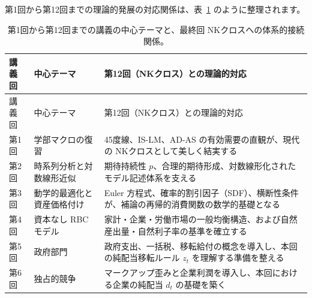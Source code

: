 \documentclass[
  japanese,
  lualatex,
  ja=standard,
  12pt,
  a4paper]{ltjsarticle}
\begin{document}
第1回から第12回までの理論的発展の対応関係は、表~\ref{tbl-course-map}
のように整理されます。

\begin{longtable}[]{@{}
  >{\raggedleft\arraybackslash}p{}
  >{\raggedright\arraybackslash}p{}
  >{\raggedright\arraybackslash}p{}@{}}
\caption{第1回から第12回までの講義の中心テーマと、最終回
NKクロスへの体系的接続関係。}\label{tbl-course-map}\tabularnewline
\toprule\noalign{}
\begin{minipage}[b]{\linewidth}\raggedleft
講義回
\end{minipage} & \begin{minipage}[b]{\linewidth}\raggedright
中心テーマ
\end{minipage} & \begin{minipage}[b]{\linewidth}\raggedright
第12回（NKクロス）との理論的対応
\end{minipage} \\
\midrule\noalign{}
\endfirsthead
\toprule\noalign{}
\begin{minipage}[b]{\linewidth}\raggedleft
講義回
\end{minipage} & \begin{minipage}[b]{\linewidth}\raggedright
中心テーマ
\end{minipage} & \begin{minipage}[b]{\linewidth}\raggedright
第12回（NKクロス）との理論的対応
\end{minipage} \\
\midrule\noalign{}
\endhead
\bottomrule\noalign{}
\endlastfoot
第1回 & 学部マクロの復習 & 45度線、IS-LM、AD-AS
の有効需要の直観が、現代の NKクロスとして美しく結実する \\
第2回 & 時系列分析と対数線形近似 & 期待持続性
\(p\)、合理的期待形成、対数線形化されたモデル記述体系を支える \\
第3回 & 動学的最適化と資産価格付け & Euler
方程式、確率的割引因子（SDF）、横断性条件が、補論の再帰的消費関数の数学的基礎となる \\
第4回 & 資本なし RBC モデル &
家計・企業・労働市場の一般均衡構造、および自然産出量・自然利子率の基準を確立する \\
第5回 & 政府部門 &
政府支出、一括税、移転給付の概念を導入し、本回の純配当移転ルール \(z_t\)
を理解する準備を整える \\
第6回 & 独占的競争 &
マークアップ歪みと企業利潤を導入し、本回における企業の純配当 \(d_t\)
の基礎を築く \\

\end{longtable}
\end{document}
